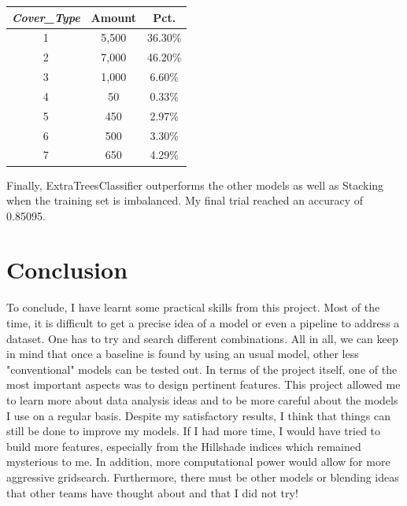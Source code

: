 \documentclass{article}
\begin{document}
\begin{multicols}{2}
\begin{center}
\captionsetup{type=tabular}
\begin{tabular}{|c|cc|}
    \hline
    \textit{Cover\_Type} & Amount & Pct. \\
    \hline
    1 & 5,500 & 36.30\% \\
    2 & 7,000 & 46.20\% \\
    3 & 1,000 & 6.60\% \\
    4 & 50 & 0.33\% \\
    5 & 450 & 2.97\% \\
    6 & 500 & 3.30\% \\
    7 & 650 & 4.29\% \\
    \hline
\end{tabular}
\label{tab:trainrepart}
\end{center}

Finally, ExtraTreesClassifier outperforms the other models as well as
Stacking when the training set is imbalanced. My final trial reached
an accuracy of 0.85095.

\section*{Conclusion}

To conclude, I have learnt some practical skills from this project. 
Most of the time, it is difficult to get a precise idea of a model or 
even a pipeline to address a dataset. One has to try and search different 
combinations. All in all, we can keep in mind that once a baseline is found by 
using an usual model, other less "conventional" models can be tested out. 
In terms of the project itself, one of the most important aspects was to 
design pertinent features. This project allowed me to learn more about 
data analysis ideas and to be more careful about the models I use on a regular 
basis. Despite my satisfactory results, I think 
that things can still be done to improve my models. If I had more time, I 
would have tried to build more features, especially from the Hillshade indices 
which remained mysterious to me. In addition, more computational power would 
allow for more aggressive gridsearch. Furthermore, there must be other models or 
blending ideas that other teams have thought about and that I did not 
try!


\begin{thebibliography}{9}


\end{thebibliography}
\end{multicols}
\end{document}
